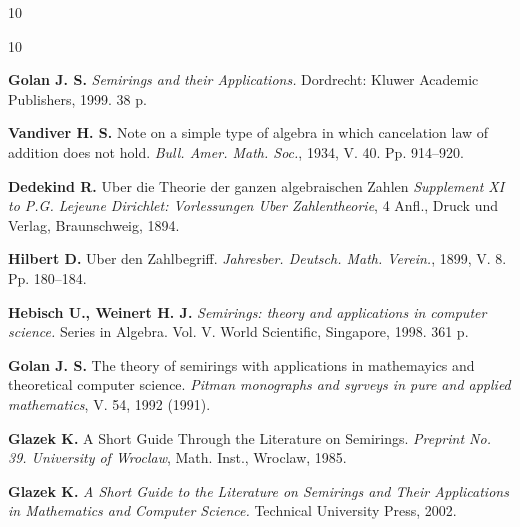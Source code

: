 \documentclass[a4paper,12pt]{book}
\begin{document}
\begin{paper}
\begin{thebibliography}{10}
		\end{thebibliography} 
		
		\renewcommand{\bibname}{References}
		\begin{thebibliography}{10}
			
			 \textbf{Golan J. S.} \textit{Semirings and their Applications.} Dordrecht: Kluwer Academic Publishers, 1999. 38 p.
			
			    \textbf{Vandiver H. S.} Note on a simple type of algebra in which cancelation law of addition does not hold. \textit{Bull. Amer. Math. Soc.}, 1934, V. 40. Pp. 914--920.
			
			 \textbf{Dedekind R.} Uber die Theorie der ganzen algebraischen Zahlen \textit{Supplement XI to P.G. Lejeune Dirichlet: Vorlessungen Uber Zahlentheorie}, 4 Anfl., Druck und Verlag, Braunschweig, 1894.
			
			 \textbf{Hilbert D.} Uber den Zahlbegriff. \textit{Jahresber. Deutsch. Math. Verein.},  1899, V. 8. Pp. 180--184.
			
			 \textbf{Hebisch U., Weinert H. J.} \textit{Semirings: theory and applications in computer science.} Series in Algebra. Vol. V. World Scientific, Singapore, 1998. 361 p.
			
			 \textbf{Golan J. S.} The theory of semirings with applications in mathemayics and theoretical computer science. \textit{Pitman monographs and syrveys in pure and applied mathematics}, V. 54, 1992 (1991).
			
			 \textbf{Glazek K.} A Short Guide Through the Literature on Semirings. \textit{Preprint No. 39. University of Wroclaw}, Math. Inst., Wroclaw,  1985.
			
			 \textbf{Glazek K.} \textit{A Short Guide to the Literature on Semirings and Their Applications in Mathematics and Computer Science.} Technical University Press, 2002.
			
		\end{thebibliography} 
		
	\end{paper}
	
\end{document}
